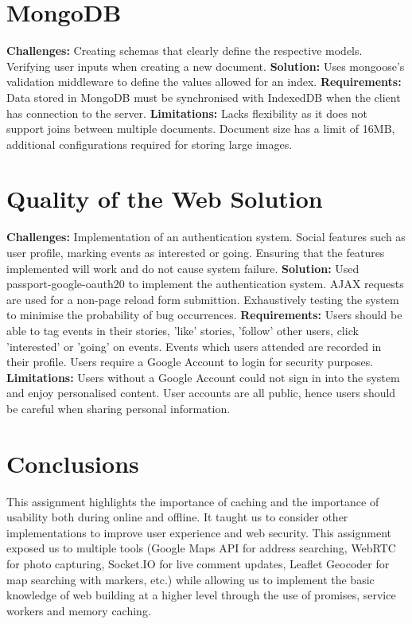\documentclass[11pt, a4paper]{article}
\begin{document}
\section{MongoDB}
\textbf{Challenges:} Creating schemas that clearly define the respective models. Verifying user
inputs when creating a new document. \textbf{Solution:} Uses mongoose's validation middleware
\cite{validation} to define the values allowed for an index. \textbf{Requirements:} Data stored in
MongoDB must be synchronised with IndexedDB when the client has connection to the server.
\textbf{Limitations:} Lacks flexibility as it does not support joins between multiple documents.
Document size has a limit of 16MB, additional configurations required for storing large images.

\section{Quality of the Web Solution}
\textbf{Challenges:} Implementation of an authentication system. Social features such as user
profile, marking events as interested or going. Ensuring that the features implemented will work and
do not cause system failure. \textbf{Solution:} Used passport-google-oauth20 \cite{passport_google}
to implement the authentication system. AJAX requests are used for a non-page reload form
submittion. Exhaustively testing the system to minimise the probability of bug occurrences.
\textbf{Requirements:} Users should be able to tag events in their stories, 'like' stories, 'follow'
other users, click 'interested' or 'going' on events. Events which users attended are recorded in
their profile. Users require a Google Account to login for security purposes. \textbf{Limitations:}
Users without a Google Account could not sign in into the system and enjoy personalised content.
User accounts are all public, hence users should be careful when sharing personal information.

\section{Conclusions}
This assignment highlights the importance of caching and the importance of usability both during
online and offline. It taught us to consider other implementations to improve user experience and
web security. This assignment exposed us to multiple tools (Google Maps API for address searching,
WebRTC for photo capturing, Socket.IO for live comment updates, Leaflet Geocoder for map searching
with markers, etc.) while allowing us to implement the basic knowledge of web building at a higher
level through the use of promises, service workers and memory caching.
\end{document}
